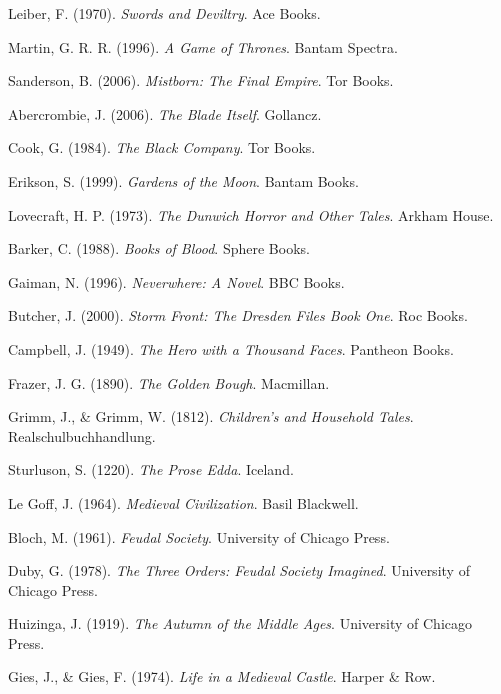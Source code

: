 Leiber, F. (1970).
\textit{Swords and Deviltry}.
Ace Books.

Martin, G. R. R. (1996).
\textit{A Game of Thrones}.
Bantam Spectra.

Sanderson, B. (2006).
\textit{Mistborn: The Final Empire}.
Tor Books.

Abercrombie, J. (2006).
\textit{The Blade Itself}.
Gollancz.

Cook, G. (1984).
\textit{The Black Company}.
Tor Books.

Erikson, S. (1999).
\textit{Gardens of the Moon}.
Bantam Books.

Lovecraft, H. P. (1973).
\textit{The Dunwich Horror and Other Tales}.
Arkham House.

Barker, C. (1988).
\textit{Books of Blood}.
Sphere Books.

Gaiman, N. (1996).
\textit{Neverwhere: A Novel}.
BBC Books.

Butcher, J. (2000).
\textit{Storm Front: The Dresden Files Book One}.
Roc Books.

Campbell, J. (1949).
\textit{The Hero with a Thousand Faces}.
Pantheon Books.

Frazer, J. G. (1890).
\textit{The Golden Bough}.
Macmillan.

Grimm, J., \& Grimm, W. (1812).
\textit{Children's and Household Tales}.
Realschulbuchhandlung.

Sturluson, S. (1220).
\textit{The Prose Edda}.
Iceland.

Le Goff, J. (1964).
\textit{Medieval Civilization}.
Basil Blackwell.

Bloch, M. (1961).
\textit{Feudal Society}.
University of Chicago Press.

Duby, G. (1978).
\textit{The Three Orders: Feudal Society Imagined}.
University of Chicago Press.

Huizinga, J. (1919).
\textit{The Autumn of the Middle Ages}.
University of Chicago Press.

Gies, J., \& Gies, F. (1974).
\textit{Life in a Medieval Castle}.
Harper \& Row.

